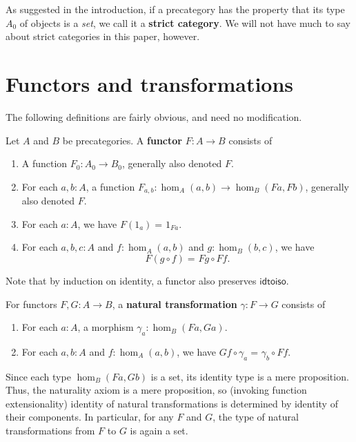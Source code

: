 \documentclass{mscs}
\newcommand{\id}[3][]{\ensuremath{#2 =_{#1} #3}\xspace}
\numberwithin{equation}{section}
\newcommand{\idtoiso}{\ensuremath{\mathsf{idtoiso}}\xspace}
\begin{document}
\begin{rmk}\label{defn:strict}
  As suggested in the introduction, if a precategory has the property that its type $A_0$ of objects is a \emph{set}, we call it a \textbf{strict category}.
  We will not have much to say about strict categories in this paper, however.
\end{rmk}


\section{Functors and transformations}
\label{sec:transfors}

The following definitions are fairly obvious, and need no modification.

\begin{defn}\label{ct:functor}
  Let $A$ and $B$ be precategories.
  A \textbf{functor} $F:A\to B$ consists of
  \begin{enumerate}
  \item A function $F_0:A_0\to B_0$, generally also denoted $F$.
  \item For each $a,b:A$, a function $F_{a,b}:\hom_A(a,b) \to \hom_B(Fa,Fb)$, generally also denoted $F$.
  \item For each $a:A$, we have $\id{F(1_a)}{1_{Fa}}$.
  \item For each $a,b,c:A$ and $f:\hom_A(a,b)$ and $g:\hom_B(b,c)$, we have
    \[\id{F(g\circ f)}{Fg\circ Ff}.\]
  \end{enumerate}
\end{defn}

Note that by induction on identity, a functor also preserves \idtoiso.

\begin{defn}\label{ct:nattrans}
  For functors $F,G:A\to B$, a \textbf{natural transformation} $\gamma:F\to G$ consists of
  \begin{enumerate}
  \item For each $a:A$, a morphism $\gamma_a:\hom_B(Fa,Ga)$.
  \item For each $a,b:A$ and $f:\hom_A(a,b)$, we have $\id{Gf\circ \gamma_a}{\gamma_b\circ Ff}$.
  \end{enumerate}
\end{defn}

Since each type $\hom_B(Fa,Gb)$ is a set, its identity type is a mere proposition.
Thus, the naturality axiom is a mere proposition, so (invoking function extensionality) identity of natural transformations is determined by identity of their components.
In particular, for any $F$ and $G$, the type of natural transformations from $F$ to $G$ is again a set.
\end{document}
